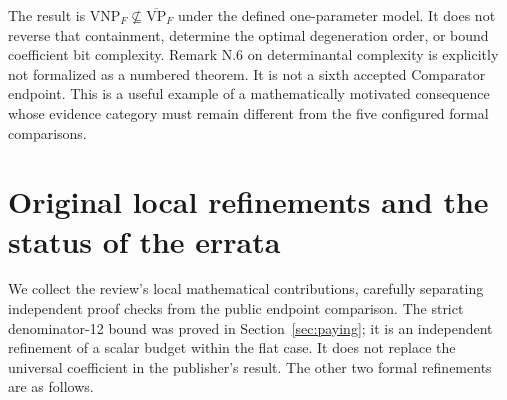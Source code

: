 \documentclass[11pt,letterpaper]{article}
\theoremstyle{definition}\newtheorem{definition}[theorem]{Definition}\newtheorem{example}[theorem]{Example}
\theoremstyle{remark}\newtheorem{remark}[theorem]{Remark}
\newcommand{\VP}{\mathrm{VP}}
\newcommand{\VNP}{\mathrm{VNP}}
\begin{document}
The result is $\VNP_F\not\subseteq\overline{\VP}_F$ under the defined one-parameter model. It does not reverse that containment, determine the optimal degeneration order, or bound coefficient bit complexity. Remark N.6 on determinantal complexity is explicitly not formalized as a numbered theorem. It is not a sixth accepted Comparator endpoint. This is a useful example of a mathematically motivated consequence whose evidence category must remain different from the five configured formal comparisons.

\section{Original local refinements and the status of the errata}\label{sec:extensions}
We collect the review's local mathematical contributions, carefully separating independent proof checks from the public endpoint comparison. The strict denominator-12 bound was proved in Section~\ref{sec:paying}; it is an independent refinement of a scalar budget within the flat case. It does not replace the universal coefficient in the publisher's result. The other two formal refinements are as follows.
\end{document}
